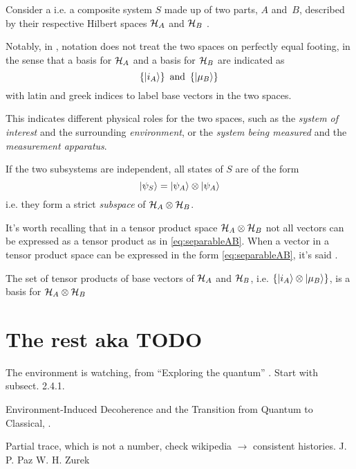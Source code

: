 Consider a 
i.e. a composite system $S$
made up of two parts, $A$ and~$B$,
described by their respective Hilbert spaces
$\mathcal{H}_A$ and $\mathcal{H}_B$ \parencite{Haroche_Exploring}.

Notably, in \cite{Haroche_Exploring},
notation does not treat the two spaces
on perfectly equal footing,
in the sense that a basis for $\mathcal{H}_A$ and a basis for $\mathcal{H}_B$
are indicated as
$$
  \left\{\ket{i_A}\right\} \text{ and } \left\{\ket{\mu_B}\right\}\,
$$
with latin and greek indices to label base vectors in the two spaces.

This indicates different physical roles for the two spaces,
such as the \emph{system of interest} and the surrounding \emph{environment},
or the \emph{system being measured} and the \emph{measurement apparatus}.

If the two subsystems are independent, all states of $S$ are of the form
\begin{equation}\label{eq:separableAB}
  \ket{\psi_S} = \ket{\psi_A}\otimes\ket{\psi_A}
\end{equation}
i.e. they form a strict \emph{subspace} of $\mathcal{H}_A\otimes\mathcal{H}_B$.

It's worth recalling that in a tensor product space $\mathcal{H}_A\otimes\mathcal{H}_B$
not all vectors can be expressed as a tensor product as in \eqref{eq:separableAB}.
When a vector in a tensor product space
can be expressed in the form \eqref{eq:separableAB},
it's said  \parencite{Nakahara}.

\begin{proposition}\label{TensorBase}
The set of tensor products of base vectors of $\mathcal{H}_A$ and $\mathcal{H}_B$,
i.e. $\left\{\ket{i_A} \otimes \ket{\mu_B}\right\}$,
is a basis for $\mathcal{H}_A \otimes \mathcal{H}_B$
\end{proposition}

\section{The rest aka TODO}

The environment is watching, from ``Exploring the quantum''
\parencite[Ch. 4]{Haroche_Exploring}. Start with subsect. 2.4.1.

Environment-Induced Decoherence and the Transition from Quantum to Classical,
\cite{Zurek_Fundamentals}.

Partial trace, which is not a number, check wikipedia $\rightarrow$ consistent histories.
J. P. Paz W. H. Zurek

